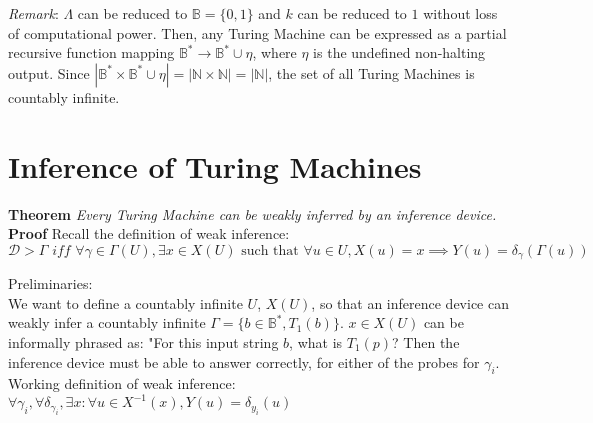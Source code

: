 \documentclass[11pt]{article}
\newcommand{\N}{\mathbb{N}}
\newcommand{\B}{\mathbb{B}}
\begin{document}
\bigbreak

\textit{Remark}: $\Lambda$ can be reduced to $ \B = \{0, 1\} $ and $ k $ can be reduced to $ 1 $ without loss of computational power. Then, any Turing Machine can be expressed as a partial recursive function mapping $ \B^{*} \rightarrow \B^{*} \cup \eta $, where $ \eta $ is the undefined non-halting output. Since $ |\B^{*} \times \B^{*} \cup \eta | = | \N \times \N | = | \N | $, the set of all Turing Machines is countably infinite. 





\pagebreak


\section{Inference of Turing Machines} 

\textbf{Theorem} \quad \textit{Every Turing Machine can be weakly inferred by an inference device.}\\
\textbf{Proof} \quad Recall the definition of weak inference: $$ \mathcal{D} > \Gamma \textit{ iff } \forall \gamma \in \Gamma(U), \exists x \in X(U) \text{ such that } \forall u \in U, X(u) = x \implies Y(u) = \delta_{\gamma}(\Gamma(u)) $$ 

Preliminaries: \\

We want to define a countably infinite $ U $, $ X(U) $, so that an inference device can weakly infer a countably infinite $ \Gamma = \{b \in \B^{*}, T_{1}(b) \} $. 
$x \in X(U) $ can be informally phrased as: "For this input string $ b $, what is $ T_{1}(p) $? Then the inference device must be able to answer correctly, for either of the probes for $ \gamma_{i} $. \\

Working definition of weak inference: $\forall \gamma_{i}, \forall \delta_{\gamma_{i}}, \exists x : \forall u \in  X^{-1}(x), Y(u) = \delta_{y_{i}}(u) $ \\
\end{document}
